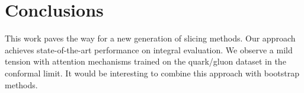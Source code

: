 \section{Conclusions}\label{sec:conclusions}

This work paves the way for a new generation of slicing methods. Our
approach achieves state-of-the-art performance on integral evaluation.
We observe a mild tension with attention mechanisms trained on the
quark/gluon dataset in the conformal limit. It would be interesting to
combine this approach with bootstrap methods.

